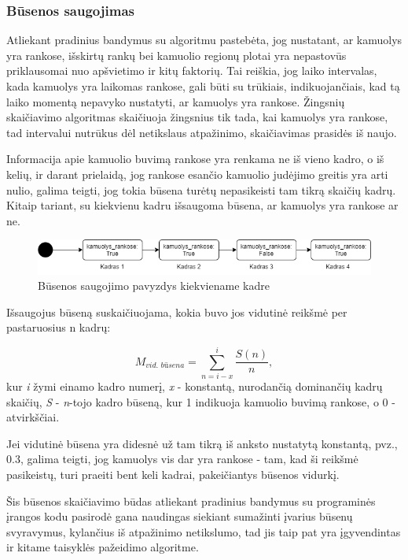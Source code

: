 \documentclass{VUMIFPSbakalaurinis}
\begin{document}
\subsubsection{Būsenos saugojimas}
Atliekant pradinius bandymus su algoritmu pastebėta, jog nustatant, ar kamuolys yra rankose, išskirtų rankų bei kamuolio regionų plotai yra nepastovūs priklausomai nuo apšvietimo ir kitų faktorių. Tai reiškia, jog laiko intervalas, kada kamuolys yra laikomas rankose, gali būti su trūkiais, indikuojančiais, kad tą laiko momentą nepavyko nustatyti, ar kamuolys yra rankose. Žingsnių skaičiavimo algoritmas skaičiuoja žingsnius tik tada, kai kamuolys yra rankose, tad intervalui nutrūkus dėl netikslaus atpažinimo, skaičiavimas prasidės iš naujo. 

Informacija apie kamuolio buvimą rankose yra renkama ne iš vieno kadro, o iš kelių, ir darant prielaidą, jog rankose esančio kamuolio judėjimo greitis yra arti nulio, galima teigti, jog tokia būsena turėtų nepasikeisti tam tikrą skaičių kadrų. Kitaip tariant, su kiekvienu kadru išsaugoma būsena, ar kamuolys yra rankose ar ne.

\begin{figure}[H]
	\centering
	\includegraphics[scale=0.6]{img/state}
	\caption{Būsenos saugojimo pavyzdys kiekviename kadre}
	\label{img:state}
\end{figure}

Išsaugojus būseną suskaičiuojama, kokia buvo jos vidutinė reikšmė per pastaruosius n kadrų: 

\begin{equation}\label{eq:avg_state}
	M_{\textit{vid. būsena}} = \sum_{n=i-x}^{i} \frac{S(n)}{n},
\end{equation}
kur \textit{i} žymi einamo kadro numerį, \textit{x} - konstantą, nurodančią dominančių kadrų skaičių, \textit{S} - \textit{n}-tojo kadro būseną, kur 1 indikuoja kamuolio buvimą rankose, o 0 - atvirkščiai.

Jei vidutinė būsena yra didesnė už tam tikrą iš anksto nustatytą konstantą, pvz., 0.3, galima teigti, jog kamuolys vis dar yra rankose - tam, kad ši reikšmė pasikeistų, turi praeiti bent keli kadrai, pakeičiantys būsenos vidurkį. 

Šis būsenos skaičiavimo būdas atliekant pradinius bandymus su programinės įrangos kodu pasirodė gana naudingas siekiant sumažinti įvarius būsenų svyravymus, kylančius iš atpažinimo netikslumo, tad jis taip pat yra įgyvendintas ir kitame taisyklės pažeidimo algoritme. 
\end{document}
